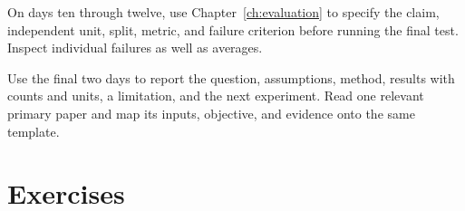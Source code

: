 On days ten through twelve, use Chapter~\ref{ch:evaluation} to specify the claim, independent unit, split, metric, and failure criterion before running the final test. Inspect individual failures as well as averages.

Use the final two days to report the question, assumptions, method, results with counts and units, a limitation, and the next experiment. Read one relevant primary paper and map its inputs, objective, and evidence onto the same template.

\section{Exercises}
\FloatBarrier
